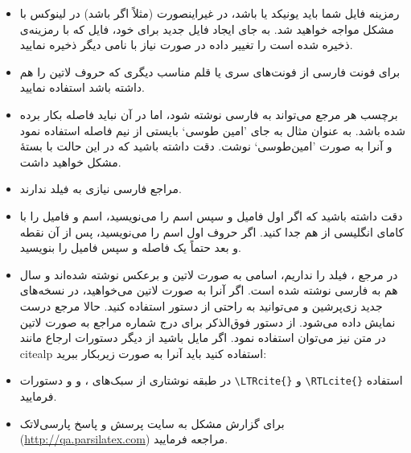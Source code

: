 \documentclass[a4paper]{article}
\theoremstyle{plain}\newtheorem{question}{پرسش}
\begin{document}
\begin{itemize}
\item رمزینه فایل  شما باید یونیکد یا  باشد، در غیراینصورت (مثلاً اگر   باشد) در لینوکس با مشکل مواجه خواهید شد. به جای ایجاد فایل  جدید برای خود،  فایل  که با رمزینه‌ی  ذخیره شده است را تغییر داده در صورت نیاز با نامی دیگر ذخیره نمایید. 
\item برای فونت فارسی از فونت‌های سری  یا قلم مناسب دیگری که حروف لاتین را هم داشته باشد استفاده نمایید.
\item برچسب‌ هر مرجع می‌تواند به فارسی نوشته شود، اما در آن نباید فاصله بکار برده شده باشد. 
به عنوان مثال به جای 'امین طوسی` بایستی از نیم فاصله استفاده نمود و آنرا به صورت 'امین‌طوسی` نوشت. دقت داشته باشید که در این حالت با بستهٔ  مشکل خواهید داشت.
\item مراجع فارسی نیازی به فیلد  ندارند.
\item دقت داشته باشید که اگر اول فامیل و سپس اسم را می‌نویسید، اسم و فامیل را با کامای انگلیسی از هم جدا کنید. اگر حروف اول اسم را می‌نویسید، پس از آن نقطه و بعد حتماً یک فاصله و سپس فامیل را بنویسید.
\item در مرجع \cite{Baker02limits}،  فیلد  را نداریم، اسامی به صورت لاتین و برعکس نوشته شده‌اند و سال هم به فارسی نوشته شده است. اگر آنرا به صورت لاتین می‌خواهید، در نسخه‌های جدید زی‌پرشین و  می‌توانید به راحتی از دستور  استفاده کنید.
حالا مرجع  درست نمایش داده می‌شود. از دستور فوق‌الذکر برای درج شماره مراجع به صورت لاتین در متن نیز می‌توان استفاده نمود. اگر مایل باشید از دیگر دستورات ارجاع مانند citealp استفاده کنید باید آنرا به صورت زیربکار ببرید:
\begin{latin}   \end{latin}

\item
در طبقه نوشتاری 
 از سبک‌های 
،  و 
و دستورات 
\verb!\LTRcite{}!
و
\verb!\RTLcite{}!
  استفاده فرمایید.

\item  برای گزارش مشکل به سایت پرسش و پاسخ پارسی‌لاتک
 (\url{http://qa.parsilatex.com})
    مراجعه فرمایید.

\end{itemize}
\end{document}
